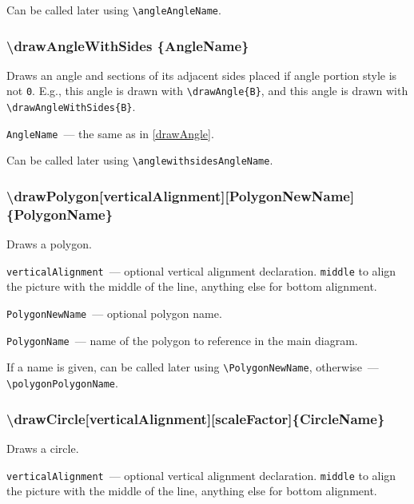 	Can be called later using \texttt{\textbackslash angleAngleName}.
	
\subsubsection{\textbackslash drawAngleWithSides \{AngleName\}}


	Draws an angle and sections of its adjacent sides placed if angle portion style is not \texttt{0}. E.g., this angle  is drawn with \texttt{\textbackslash drawAngle\{B\}}, and this angle  is drawn with \texttt{\textbackslash drawAngleWithSides\{B\}}. 

	\texttt{AngleName}~— the same as in \ref{drawAngle}.
	
	Can be called later using \texttt{\textbackslash anglewithsidesAngleName}.
	
\subsubsection{\textbackslash drawPolygon[verticalAlignment][PolygonNewName] \{Poly\-gon\-Na\-me\}}

	Draws a polygon.

	\texttt{verticalAlignment}~— optional vertical alignment declaration. \texttt{middle} to align the picture with the middle of the line, anything else for bottom alignment.

	\texttt{PolygonNewName}~— optional polygon name. 
	
	\texttt{PolygonName}~— name of the polygon to reference in the main diagram. 
	
	If a name is given, can be called later using \texttt{\textbackslash PolygonNewName}, otherwise~— \texttt{\textbackslash polygonPolygonName}. 
	
\subsubsection{\textbackslash drawCircle[verticalAlignment][scaleFactor]\{CircleName\}}

	Draws a circle.

	\texttt{verticalAlignment}~— optional vertical alignment declaration. \texttt{middle} to align the picture with the middle of the line, anything else for bottom alignment.
	
